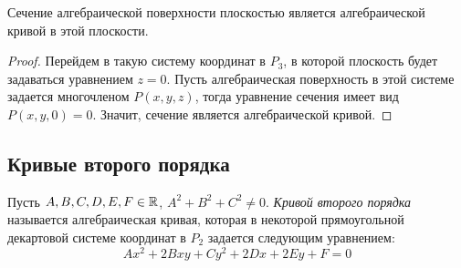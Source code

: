 \begin{proposition}
	Сечение алгебраической поверхности плоскостью является алгебраической кривой в этой плоскости.
\end{proposition}

\begin{proof}
	Перейдем в такую систему координат в $P_3$, в которой плоскость будет задаваться уравнением $z = 0$. Пусть алгебраическая поверхность в этой системе задается многочленом $P(x, y, z)$, тогда уравнение сечения имеет вид $P(x, y, 0) = 0$. Значит, сечение является алгебраической кривой.
\end{proof}

\subsection{Кривые второго порядка}

\begin{definition}
	Пусть $A, B, C, D, E, F \in \mathbb{R}$, $A^2 + B^2 + C^2 \ne 0$. \textit{Кривой второго порядка} называется алгебраическая кривая, которая в некоторой прямоугольной декартовой системе координат в $P_2$ задается следующим уравнением:
	\[Ax^2 + 2Bxy + Cy^2 + 2Dx + 2Ey + F = 0\]
\end{definition}

